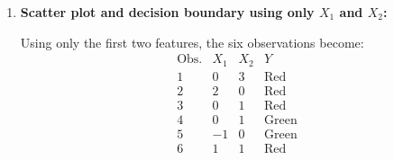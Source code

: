 \documentclass[11pt]{article}
\begin{document}
\begin{enumerate}
    \textbf{(a) Uniform weights}

    Each of the 3 neighbors gets weight \(1/3\). Since among the 3 nearest neighbors we have
    \[
    \text{Red: }2, \qquad \text{Green: }1,
    \]
    the class probabilities are
    \[
    P(\text{Red}\mid x_0)=\frac{2}{3},\qquad
    P(\text{Green}\mid x_0)=\frac{1}{3}.
    \]

    Hence the prediction is
    \[
    \boxed{\text{Red}}.
    \]

    \textbf{(b) Distance weights}

    The weight formula is
    \[
    w_i=\frac{e^{-d_i^2}}{\sum_{j=1}^{K}e^{-d_j^2}}.
    \]

    For the 3 nearest neighbors:
    \[
    d_5=\sqrt{2},\qquad d_6=\sqrt{3},\qquad d_2=2.
    \]

    Therefore,
    \[
    e^{-d_5^2}=e^{-2},\qquad e^{-d_6^2}=e^{-3},\qquad e^{-d_2^2}=e^{-4}.
    \]

    The denominator is
    \[
    e^{-2}+e^{-3}+e^{-4}.
    \]

    So the normalized weights are
    \[
    w_5=\frac{e^{-2}}{e^{-2}+e^{-3}+e^{-4}}\approx 0.6652,
    \]
    \[
    w_6=\frac{e^{-3}}{e^{-2}+e^{-3}+e^{-4}}\approx 0.2447,
    \]
    \[
    w_2=\frac{e^{-4}}{e^{-2}+e^{-3}+e^{-4}}\approx 0.0900.
    \]

    Since Observation 5 is Green and Observations 6 and 2 are Red:
    \[
    P(\text{Green}\mid x_0)=w_5\approx 0.6652,
    \]
    \[
    P(\text{Red}\mid x_0)=w_6+w_2\approx 0.2447+0.0900=0.3348.
    \]

    Thus under distance weighting, the prediction is
    \[
    \boxed{\text{Green}}.
    \]

    \medskip
    \noindent
    \textbf{Conclusion for \(K=3\):}
    \[
    \boxed{
    \begin{array}{l}
    \text{Uniform weights: predict Red, with }P(\text{Red})=\frac{2}{3},\;P(\text{Green})=\frac{1}{3},\\[4pt]
    \text{Distance weights: predict Green, with }P(\text{Green})\approx 0.6652,\;P(\text{Red})\approx 0.3348.
    \end{array}}
    \]

    \item \textbf{Scatter plot and decision boundary using only \(X_1\) and \(X_2\):}

    Using only the first two features, the six observations become:
    \[
    \begin{array}{c|c|c|c}
    \text{Obs.} & X_1 & X_2 & Y\\
    \hline
    1 & 0 & 3 & \text{Red}\\
    2 & 2 & 0 & \text{Red}\\
    3 & 0 & 1 & \text{Red}\\
    4 & 0 & 1 & \text{Green}\\
    5 & -1 & 0 & \text{Green}\\
    6 & 1 & 1 & \text{Red}
    \end{array}
    \]


\end{enumerate}
\end{document}
